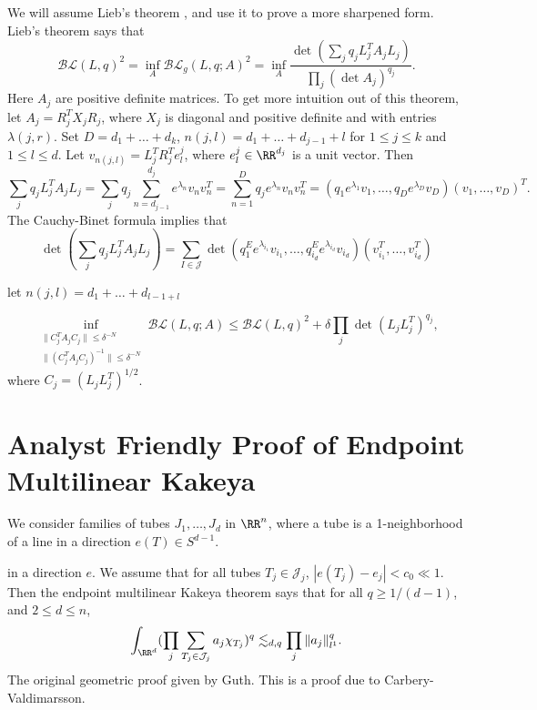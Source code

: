 We will assume Lieb's theorem , and use it to prove a more sharpened form. Lieb's theorem says that
%
\[ \mathcal{BL}(L,q)^2 = \inf_A \mathcal{BL}_g(L,q;A)^2 = \inf_A \frac{\det( \sum_j q_j L_j^T A_j L_j )}{ \prod_j (\det A_j)^{q_j} }. \]
%
Here $A_j$ are positive definite matrices. To get more intuition out of this theorem, let $A_j = R_j^T X_j R_j$, where $X_j$ is diagonal and positive definite and with entries $\lambda(j,r)$. Set $D = d_1 + \dots + d_k$, $n(j,l) = d_1 + \dots + d_{j-1} + l$ for $1 \leq j \leq k$ and $1 \leq l \leq d$. Let $v_{n(j,l)} = L^T_j R_j^T e_l^j$, where $e_l^j \in \RR^{d_j}$ is a unit vector. Then
%
\[ \sum_j q_j L_j^T A_j L_j = \sum_j q_j \sum_{n = d_{j-1}}^{d_j} e^{\lambda_n} v_n v_n^T = \sum_{n = 1}^D q_j e^{\lambda_n} v_n v_n^T = (q_1 e^{\lambda_1} v_1, \dots, q_D e^{\lambda_D} v_D) (v_1, \dots, v_D)^T. \]
%
The Cauchy-Binet formula implies that
%
\[ \det(\sum_j q_j L_j^T A_j L_j) = \sum_{I \in \mathcal{J}} \det ( q_1^E e^{\lambda_{i_1}} v_{i_1}, \dots, q_{i_d}^E e^{\lambda_{i_d}} v_{i_d} ) ( v_{i_1}^T, \dots, v_{i_d}^T ) \]


let $n(j,l) = d_1 + \dots + d_{l-1+ l}$

%
\[ \inf_{\substack{\| C_j^T A_j C_j \| \leq \delta^{-N} \\ \| (C_j^T A_j C_j)^{-1} \| \leq \delta^{-N} }} \mathcal{BL}(L,q;A) \leq \mathcal{BL}(L,q)^2 + \delta \prod_j \det(L_j L_j^T)^{q_j}, \]
%
where $C_j = (L_j L_j^T)^{1/2}$.






\section{Analyst Friendly Proof of Endpoint Multilinear Kakeya}

% 


We consider families of tubes $J_1,\dots,J_d$ in $\RR^n$, where a tube is a 1-neighborhood of a line in a direction $e(T) \in S^{d-1}$. 

in a direction $e$. We assume that for all tubes $T_j \in \mathcal{J}_j$, $|e(T_j) - e_j| < c_0 \ll 1$. Then the endpoint multilinear Kakeya theorem says that for all $q \geq 1/(d-1)$, and $2 \leq d \leq n$,
%
\[ \int_{\RR^d} (\prod_j \sum_{T_j \in \mathcal{J}_j} a_j \chi_{T_j} )^q \lesssim_{d,q} \prod_j \| a_j \|_{l^1}^q. \]
%
The original geometric proof given by Guth. This is a proof due to Carbery-Valdimarsson.

